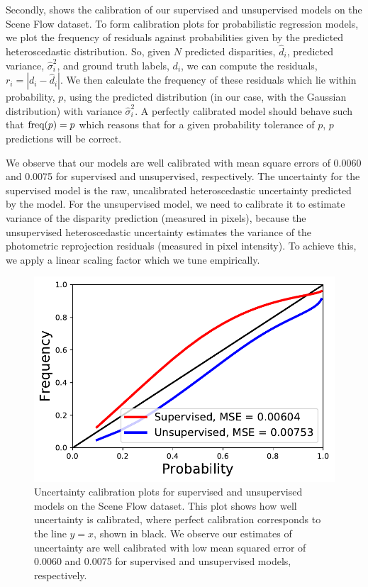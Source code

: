 Secondly,  shows the calibration of our supervised and unsupervised models on the Scene Flow dataset. To form calibration plots for probabilistic regression models, we plot the frequency of residuals against probabilities given by the predicted heteroscedastic distribution. So, given $N$ predicted disparities, $\hat{d}_i$, predicted variance, $\hat{\sigma}^2_i$, and ground truth labels, $d_i$, we can compute the residuals, $r_i=|d_i-\hat{d}_i|$. We then calculate the frequency of these residuals which lie within probability, $p$, using the predicted distribution (in our case, with the Gaussian distribution) with variance $\hat{\sigma}^2_i$.
A perfectly calibrated model should behave such that $\textnormal{freq}(p)=p$ which reasons that for a given probability tolerance of $p$, $p$ predictions will be correct.

We observe that our models are well calibrated with mean square errors of 0.0060 and 0.0075 for supervised and unsupervised, respectively. The uncertainty for the supervised model is the raw, uncalibrated heteroscedastic uncertainty predicted by the model. For the unsupervised model, we need to calibrate it to estimate variance of the disparity prediction (measured in pixels), because the unsupervised heteroscedastic uncertainty estimates the variance of the photometric reprojection residuals (measured in pixel intensity). To achieve this, we apply a linear scaling factor which we tune empirically.

\begin{figure}[h]
\centering
\includegraphics[width=0.5\linewidth]{uncertainty/calibration_plots_regression}
\caption[Uncertainty calibration plots.]{Uncertainty calibration plots for supervised and unsupervised models on the Scene Flow dataset. This plot shows how well uncertainty is calibrated, where perfect calibration corresponds to the line $y=x$, shown in black. We observe our estimates of uncertainty are well calibrated with low mean squared error of 0.0060 and 0.0075 for supervised and unsupervised models, respectively.}
\label{fig:calibration}
\end{figure}


